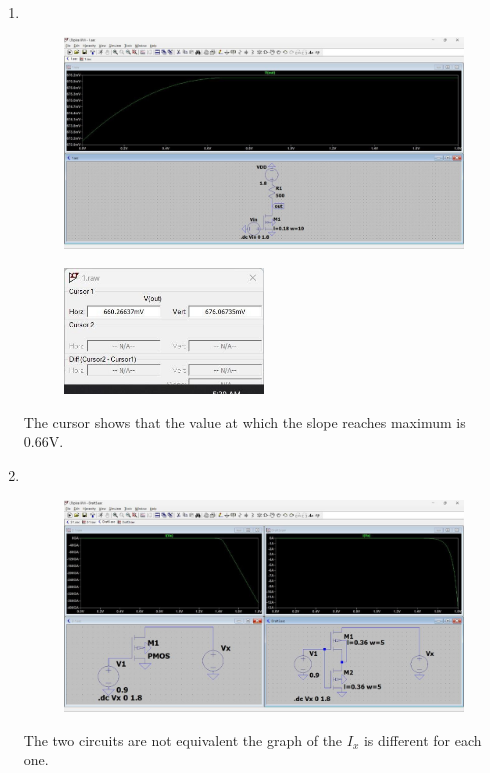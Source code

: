 \documentclass{zc-ust-hw}
\begin{document}
\maketitle

\begin{enumerate}
  \item \,
    \begin{figure}[h]
      \centering
      \includegraphics[width=\textwidth]{figures/1.jpg}
      \caption{}
    \end{figure}

    \begin{figure}[h]
      \centering
      \includegraphics[width=0.5\textwidth]{figures/2.jpg}
      \caption{}
    \end{figure}

    The cursor shows that the value at which the slope reaches maximum is 0.66V.

    \newpage

  \item \,

    \begin{figure}[h]
      \centering
      \includegraphics[width=\textwidth]{figures/cursor.jpg}
      \caption{}
    \end{figure}

    The two circuits are not equivalent the graph of the \( I_{x} \) is different for each one.


\end{enumerate}
\end{document}
